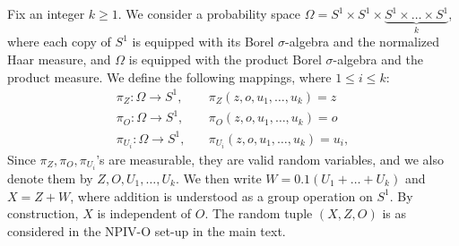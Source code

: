 \documentclass[11pt]{article}
\newcommand{\0}{\mathbf{0}}
\begin{document}
\begin{appendix}
Fix an integer $k\geq 1$. 
We consider a probability space $\Omega = S^1 \times  S^1 \times \underbrace{S^1 \times \dots \times S^1}_{k}$, where each copy of $S^1$ is equipped with its Borel $\sigma$-algebra and the normalized Haar measure, and $\Omega$ is equipped with the product Borel $\sigma$-algebra and the product measure. We define the following mappings, where $1\leq i\leq k$:
\begin{align*}
    \pi_Z  : \Omega \to S^1, \quad&\pi_Z(z,o, u_1,\dots, u_k) = z \\
    \pi_{O} : \Omega \to S^1, \quad&\pi_{O}(z, o, u_1, \dots, u_k) = o \\
    \pi_{U_i} : \Omega \to S^1, \quad&\pi_{U_i}(z,o,u_1,\dots,u_k) = u_i,
\end{align*}
Since $\pi_Z, \pi_O, \pi_{U_i}$'s are measurable, they are valid random variables, and we also denote them by $Z,O, U_1,\dots, U_k$. We then write $W = 0.1(U_1 + \dots + U_k)$ and $X = Z + W$, where addition is understood as a group operation on $S^1$. By construction, $X$ is independent of $O$. The random tuple $(X,Z,O)$ is as considered in the NPIV-O set-up in the main text. 


\end{appendix}
\end{document}
